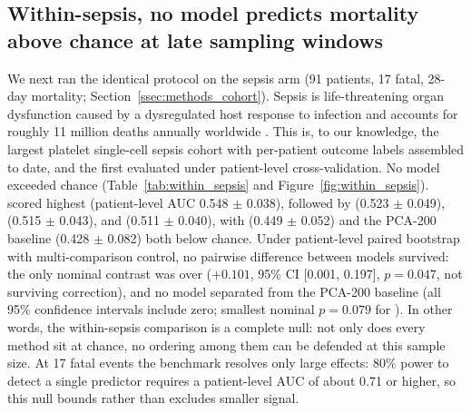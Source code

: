 \subsection{Within-sepsis, no model predicts mortality above chance at late sampling windows}
\label{ssec:r2_within_sepsis}

We next ran the identical protocol on the sepsis arm (91 patients, 17 fatal,
28-day mortality; Section~\ref{ssec:methods_cohort}). Sepsis is
life-threatening organ dysfunction caused by a dysregulated host response to
infection \citep{singer2016sepsis3} and accounts for roughly 11 million
deaths annually worldwide \citep{rudd2020global}. This is, to our
knowledge, the largest platelet single-cell sepsis cohort with per-patient
outcome labels assembled to date, and the first evaluated under patient-level
cross-validation. No model exceeded chance
(Table~\ref{tab:within_sepsis} and Figure~\ref{fig:within_sepsis}).
 scored highest (patient-level AUC 0.548 $\pm$ 0.038), followed by
 (0.523 $\pm$ 0.049),  (0.515 $\pm$ 0.043),
and  (0.511 $\pm$ 0.040), with  (0.449 $\pm$ 0.052)
and the PCA-200 baseline (0.428 $\pm$ 0.082) both below chance. Under
patient-level paired bootstrap with multi-comparison control, no pairwise
difference between models survived:
the only nominal contrast was  over  ($+0.101$,
95\% CI [0.001, 0.197], $p = 0.047$, not surviving correction), and no model
separated from the PCA-200 baseline (all 95\% confidence intervals include
zero; smallest nominal $p = 0.079$ for ). In other words, the
within-sepsis comparison is a complete null: not only does every method sit at
chance, no ordering among them can be defended at this sample size. At 17
fatal events the benchmark resolves only large effects: 80\% power to detect
a single predictor requires a patient-level AUC of about 0.71 or higher, so
this null bounds rather than excludes smaller signal.

